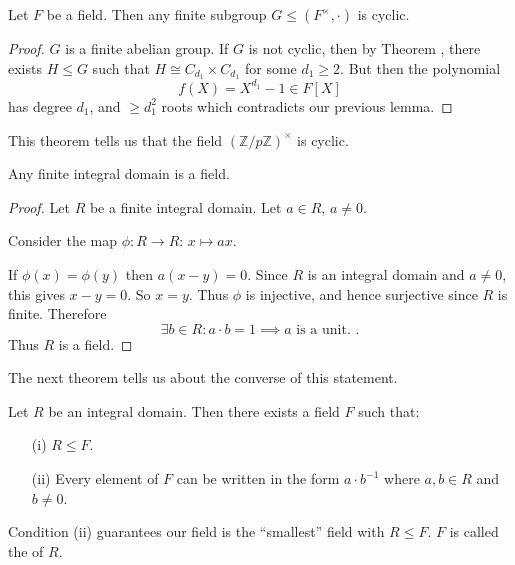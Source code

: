\documentclass[egregdoesnotlikesansseriftitles,a4paper]{scrartcl}
\begin{document}
\begin{theorem}
       Let $F$ be a field. Then any finite subgroup $G \leq (F^{\times},\cdot )$ is cyclic.
\end{theorem}
\begin{proof}
       $G$ is a finite abelian group. If $G$ is not cyclic, then by Theorem , there exists $H \leq G$ such that $H \cong C_{d_1 }\times C_{d_1 }      $ for some $d_1 \geq 2$. But then the polynomial \[
       f (X)=X^{d_1 }-1 \in F[X]
       \] has degree $d_1 $, and $\geq d_1^2$ roots which contradicts our previous lemma.
\end{proof}
\begin{example*}
      This theorem tells us that the field $(\mathbb{Z}/p\mathbb{Z})^{\times}$ is cyclic. 
\end{example*}
\begin{proposition}
       Any finite integral domain is a field.
\end{proposition}
\begin{proof}
       Let $R$ be a finite integral domain. Let $a \in R$, $a \neq 0$.

       Consider the map $\phi : R \rightarrow R$: $x \mapsto ax$.

       If $\phi (x)=\phi (y)$ then $a (x-y)=0$. Since $R$ is an integral domain and $a \neq 0$, this gives $x-y=0$. So $x=y$. Thus $\phi $ is injective, and hence surjective since $R$ is finite. Therefore \[
       \exists b \in R: a \cdot b=1 \implies a \text{ is a unit. } 
       .\] Thus $R$ is a field.
\end{proof}
The next theorem tells us about the converse of this statement.
\begin{theorem}
       Let $R$ be an integral domain. Then there exists a field $F$ such that:
       \begin{itemize}
             \item[(i)] $R \leq F$.
             \item[(ii)] Every element of $F$ can be written in the form $a \cdot b^{-1}$ where $a,b \in R$ and $b \neq 0$.
       \end{itemize}
       \begin{remark}
            Condition (ii) guarantees our field is the ``smallest'' field with $R \leq F$. $F$ is called the  of $R$.
       \end{remark}
\end{theorem}
\end{document}
